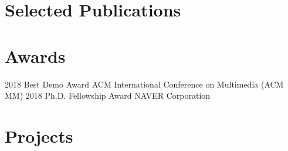 \documentclass[]{friggeri-cv}
\begin{document}
\section{Selected Publications}

\begin{refsection}
  \nocite{*}
  \printbibliography[
    type=article, 
    title=\textbf{Publications of peer-reviewed journal articles}, 
    heading=subbibliography
  ]
\end{refsection}

\begin{refsection}
  \nocite{*}
  \printbibliography[
    type=inproceedings, 
    title=\textbf{Proceedings of peer-reviewed conference papers}, 
    heading=subbibliography,
    keyword={selected}
  ]
\end{refsection}

\section{Awards}

\begin{entrylist}
  \entry
    {2018}
    {Best Demo Award}
    {}
    {ACM International Conference on Multimedia (ACM MM)}
\entry
    {2018}
    {Ph.D. Fellowship Award}
    {}
    {NAVER Corporation}
\end{entrylist}

\section{Projects}
\end{document}
